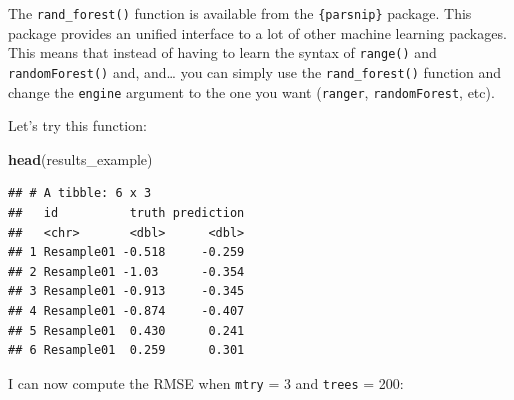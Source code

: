 \documentclass[]{gitbook}
\newenvironment{Shaded}{\begin{snugshade}}{\end{snugshade}}
\newcommand{\DataTypeTok}[1]{\textcolor[rgb]{0.13,0.29,0.53}{#1}}
\newcommand{\DecValTok}[1]{\textcolor[rgb]{0.00,0.00,0.81}{#1}}
\newcommand{\KeywordTok}[1]{\textcolor[rgb]{0.13,0.29,0.53}{\textbf{#1}}}
\newcommand{\NormalTok}[1]{#1}
\newcommand{\OperatorTok}[1]{\textcolor[rgb]{0.81,0.36,0.00}{\textbf{#1}}}
\newcommand{\StringTok}[1]{\textcolor[rgb]{0.31,0.60,0.02}{#1}}
\begin{document}
The \texttt{rand\_forest()} function is available from the \texttt{\{parsnip\}} package. This package provides an
unified interface to a lot of other machine learning packages. This means that instead of having to
learn the syntax of \texttt{range()} and \texttt{randomForest()} and, and\ldots{} you can simply use the \texttt{rand\_forest()}
function and change the \texttt{engine} argument to the one you want (\texttt{ranger}, \texttt{randomForest}, etc).

Let's try this function:

\begin{Shaded}
\end{Shaded}

\begin{Shaded}
\begin{Highlighting}[]
\KeywordTok{head}\NormalTok{(results_example)}
\end{Highlighting}
\end{Shaded}

\begin{verbatim}
## # A tibble: 6 x 3
##   id          truth prediction
##   <chr>       <dbl>      <dbl>
## 1 Resample01 -0.518     -0.259
## 2 Resample01 -1.03      -0.354
## 3 Resample01 -0.913     -0.345
## 4 Resample01 -0.874     -0.407
## 5 Resample01  0.430      0.241
## 6 Resample01  0.259      0.301
\end{verbatim}

I can now compute the RMSE when \texttt{mtry} = 3 and \texttt{trees} = 200:

\begin{Shaded}
\end{Shaded}
\end{document}
